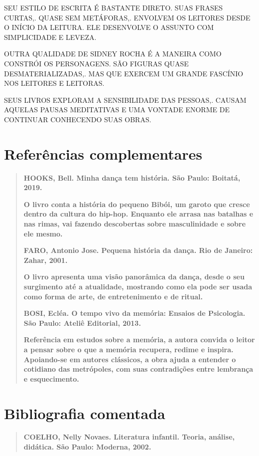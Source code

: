 \documentclass{extarticle}
\begin{document}
SEU ESTILO DE ESCRITA É BASTANTE DIRETO. SUAS FRASES CURTAS,. QUASE SEM
METÁFORAS,. ENVOLVEM OS LEITORES DESDE O INÍCIO DA LEITURA. ELE
DESENVOLVE O ASSUNTO COM SIMPLICIDADE E LEVEZA.
 
OUTRA QUALIDADE DE SIDNEY ROCHA É A MANEIRA COMO CONSTRÓI OS
PERSONAGENS. SÃO FIGURAS QUASE DESMATERIALIZADAS,. MAS QUE EXERCEM UM
GRANDE FASCÍNIO NOS LEITORES E LEITORAS.~
 
SEUS LIVROS EXPLORAM A SENSIBILIDADE DAS PESSOAS,. CAUSAM AQUELAS PAUSAS
MEDITATIVAS E UMA VONTADE ENORME DE CONTINUAR CONHECENDO SUAS OBRAS.

\section{Referências complementares}

\begin{quote}
\textbf{HOOKS, Bell. Minha dança tem história. São Paulo: Boitatá,
2019.}

\textbf{O livro conta a história do pequeno Bibói, um garoto que cresce
dentro da cultura do hip-hop. Enquanto ele arrasa nas batalhas e nas
rimas, vai fazendo descobertas sobre masculinidade e sobre ele mesmo.}

\textbf{FARO, Antonio Jose. Pequena história da dança. Rio de Janeiro:
Zahar, 2001.}

\textbf{O livro apresenta uma visão panorâmica da dança, desde o seu
surgimento até a atualidade, mostrando como ela pode ser usada como
forma de arte, de entretenimento e de ritual.}

\textbf{BOSI, Ecléa. O tempo vivo da memória: Ensaios de Psicologia. São
Paulo: Ateliê Editorial, 2013.}

\textbf{Referência em estudos sobre a memória, a autora convida o leitor
a pensar sobre o que a memória recupera, redime e inspira. Apoiando-se
em autores clássicos, a obra ajuda a entender o cotidiano das
metrópoles, com suas contradições entre lembrança e esquecimento.}
\end{quote}


\section{Bibliografia comentada}

\begin{quote}
\textbf{COELHO, Nelly Novaes. Literatura infantil. Teoria, análise,
didática. São Paulo: Moderna, 2002.}
\end{quote}
\end{document}
